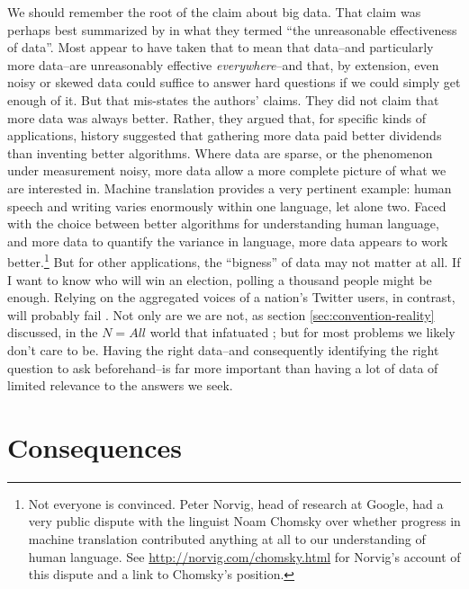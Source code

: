 \documentclass[12pt]{article}
\begin{document}
We should remember the root of the claim about big data. That claim
was perhaps best summarized by \cite{halevy2009unreasonable} in what
they termed ``the unreasonable effectiveness of data''. Most appear to
have
taken that to mean that data--and particularly more data--are
unreasonably effective \textit{everywhere}--and that, by extension,
even noisy or skewed data could suffice to answer hard questions if we
could simply get enough of it. But that mis-states the authors'
claims. They did not claim that more data was always better. Rather,
they argued that, for specific kinds
of applications, history suggested that gathering more data paid better
dividends than inventing better algorithms. Where data are sparse, or
the phenomenon under measurement noisy, more data allow a more
complete picture of what we are interested in. Machine translation
provides a very pertinent example: human speech and writing varies
enormously within one language, let alone two. Faced with the choice
between better algorithms for understanding human language, and more
data to quantify the variance in language, more data appears to work
better.\footnote{Not everyone is convinced. Peter Norvig, head of
  research at Google, had a very public dispute with the linguist Noam
Chomsky over whether progress in machine translation contributed
anything at all to our understanding of human language. See
\url{http://norvig.com/chomsky.html} for Norvig's account of this
dispute and a link to Chomsky's position.} But for other applications, the ``bigness'' of data may not matter at
all. If I want to know who will win an election, polling a thousand
people might be enough. Relying on the aggregated voices of a nation's
Twitter users, in contrast, will probably
fail \citep{gayo2011limits,gayo2012wanted,huberty2013}. Not only are
we are not, as section \ref{sec:convention-reality} discussed, 
in the $N=All$ world that infatuated
\cite{mayer2013big}; but for most problems we likely don't
care to be. Having the right data--and consequently identifying the right
question to ask beforehand--is far more important than having a lot of
data of limited relevance to the answers we seek.


\section{Consequences}
\label{sec:consequences}
\end{document}
